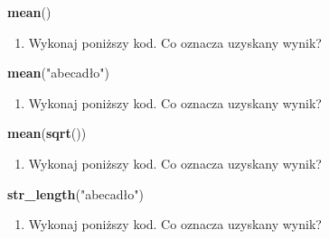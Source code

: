\documentclass[paper=6in:9in,pagesize=pdftex,headinclude=on,footinclude=on,10pt]{scrbook}
\newenvironment{Shaded}{\begin{snugshade}}{\end{snugshade}}
\newcommand{\KeywordTok}[1]{\textcolor[rgb]{0.13,0.29,0.53}{\textbf{#1}}}
\newcommand{\NormalTok}[1]{#1}
\newcommand{\StringTok}[1]{\textcolor[rgb]{0.31,0.60,0.02}{#1}}
\providecommand{\tightlist}{%
  \setlength{\itemsep}{0pt}\setlength{\parskip}{0pt}}
\begin{document}
\begin{Shaded}
\begin{Highlighting}[]
\KeywordTok{mean}\NormalTok{()}
\end{Highlighting}
\end{Shaded}

\begin{enumerate}
\def\labelenumi{\arabic{enumi})}
\setcounter{enumi}{9}
\tightlist
\item
  Wykonaj poniższy kod.
  Co oznacza uzyskany wynik?
\end{enumerate}

\begin{Shaded}
\begin{Highlighting}[]
\KeywordTok{mean}\NormalTok{(}\StringTok{"abecadło"}\NormalTok{)}
\end{Highlighting}
\end{Shaded}

\begin{enumerate}
\def\labelenumi{\arabic{enumi})}
\setcounter{enumi}{10}
\tightlist
\item
  Wykonaj poniższy kod.
  Co oznacza uzyskany wynik?
\end{enumerate}

\begin{Shaded}
\begin{Highlighting}[]
\KeywordTok{mean}\NormalTok{(}\KeywordTok{sqrt}\NormalTok{())}
\end{Highlighting}
\end{Shaded}

\begin{enumerate}
\def\labelenumi{\arabic{enumi})}
\setcounter{enumi}{11}
\tightlist
\item
  Wykonaj poniższy kod.
  Co oznacza uzyskany wynik?
\end{enumerate}

\begin{Shaded}
\begin{Highlighting}[]
\KeywordTok{str_length}\NormalTok{(}\StringTok{"abecadło"}\NormalTok{)}
\end{Highlighting}
\end{Shaded}

\begin{enumerate}
\def\labelenumi{\arabic{enumi})}
\setcounter{enumi}{12}
\tightlist
\item
  Wykonaj poniższy kod.
  Co oznacza uzyskany wynik?
\end{enumerate}
\end{document}
